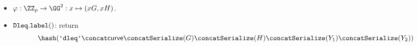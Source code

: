 \documentclass[11pt]{article}
\begin{document}
\begin{itemize}
  \item $\varphi:\ZZ_p\to\GG^2:x\mapsto (xG,xH)$.
  \item $\texttt{Dleq}.\texttt{label}()$: return
  \[
    \hash(\dleqlabel \concat \curvectx \concat \serialize(G) \concat \serialize(H) \concat \serialize(\statement_1) \concat \serialize(\statement_2))
  \]
\end{itemize}
\end{document}
